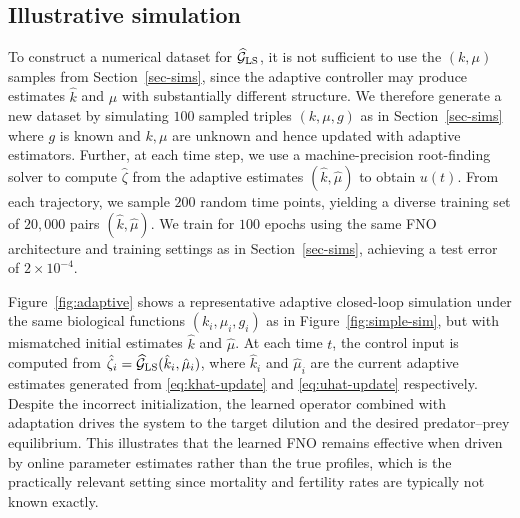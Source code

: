 \documentclass[journal,twoside,web]{ieeecolor}
\begin{document}
\subsection{Illustrative simulation}
To construct a numerical dataset for $\widehat{\mathcal{G}}_{\rm LS}$, it is not sufficient to use the $(k,\mu)$ samples from Section~\ref{sec-sims}, since the adaptive controller may produce estimates $\hat{k}$ and $\hat{\mu}$ with substantially different structure. We therefore generate a new dataset by simulating $100$ sampled triples $(k,\mu,g)$ as in Section~\ref{sec-sims}  where $g$ is known and $k, \mu$ are unknown and hence updated with adaptive estimators. Further, at each time step, we use a machine-precision root-finding solver to compute $\hat{\zeta}$ from the adaptive estimates $(\hat{k}, \hat{\mu})$ to obtain $u(t)$. From each trajectory, we sample $200$ random time points, yielding a diverse training set of $20{,}000$ pairs $(\hat{k},\hat{\mu})$. We train for $100$ epochs using the same FNO architecture and training settings as in Section~\ref{sec-sims}, achieving a test error of $2\times 10^{-4}$.

Figure~\ref{fig:adaptive} shows a representative adaptive closed-loop simulation under the same biological functions $(k_i, \mu_i, g_i)$ as in Figure~\ref{fig:simple-sim}, but with mismatched initial estimates $\hat{k}$ and $\hat{\mu}$. At each time $t$, the control input is computed from $\hat{\zeta}_i=\widehat{\mathcal{G}}_{\rm LS}(\hat{k}_i,\hat{\mu}_i)$, where $\hat{k}_i$ and $\hat{\mu}_i$ are the current adaptive estimates generated from \eqref{eq:khat-update} and \eqref{eq:uhat-update} respectively. Despite the incorrect initialization, the learned operator combined with adaptation drives the system to the target dilution and the desired predator--prey equilibrium. This illustrates that the learned FNO remains effective when driven by online parameter estimates rather than the true profiles, which is the practically relevant setting since mortality and fertility rates are typically not known exactly.  
\end{document}
